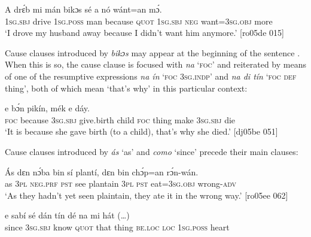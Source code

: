 \ea%
    \label{ex:key:1504}
    \gll A    drɛ́b    mi    mán    bikɔs  sé    a    nó  wánt=an    mɔ́.\\
\textsc{1sg.sbj}  drive  \textsc{1sg.poss}  man    because  \textsc{quot}    \textsc{1sg.sbj}  \textsc{neg}  want=\textsc{3sg.obj}  more\\

\glt  ‘I drove my husband away because I didn’t want him anymore.’ [ro05de 015]
\z

Cause clauses introduced by \textit{bikɔs} may appear at the beginning of the sentence . When this is so, the cause clause is focused with \textit{na} ‘\textsc{foc}’ and reiterated by means of one of the resumptive expressions \textit{na ín} ‘\textsc{foc} \textsc{3sg.indp}’ and \textit{na di tín} ‘\textsc{foc} \textsc{def} thing’, both of which mean ‘that’s why’ in this particular context:


\ea%
    \label{ex:key:1505}
    \gll {}    e    bɔ́n      pikín,       
mék    e    dáy.\\
\textsc{foc} because \textsc{3sg.sbj} give.birth  child  \textsc{foc} thing make  \textsc{3sg.sbj}  die\\

\glt ‘It is because she gave birth (to a child), that’s why she died.’ [dj05be 051]
\z

Cause clauses introduced by \textit{ás} ‘as’  and \textit{como} ‘since’  precede their main clauses:


\ea%
    \label{ex:key:1506}
    \gll \'{A}s  dɛn  nɔ́ba  bin  sí  plantí,  dɛn  bin  chɔ́p=an    rɔ́n-wán.\\
as  \textsc{3pl}  \textsc{neg}.\textsc{prf}  \textsc{pst}  see  plantain  \textsc{3pl}  \textsc{pst}  eat=\textsc{3sg.obj}  wrong\textsc{{}-adv}\\

\glt ‘As they hadn’t yet seen plaintain, they ate it in the wrong way.’ [ro05ee 062]
\z


\ea%
    \label{ex:key:1507}
    \gll {}  e    sabí    sé    dán  tín    dé    na  mi    hát  (…)\\
since  \textsc{3sg.sbj}  know  \textsc{quot}    that  thing  \textsc{be.loc}  \textsc{loc}  \textsc{1sg.poss}  heart\\

